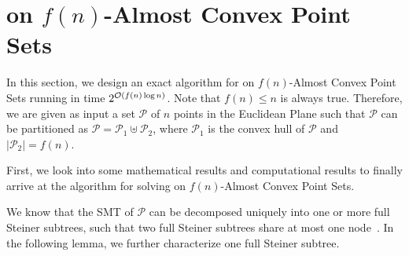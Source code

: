 


\section{\ESMT on $f(n)$-Almost Convex Point Sets}\label{sec:exact_algo}



In this section, we design an exact algorithm for \ESMT on $f(n)$-Almost Convex Point Sets running in time $2^{\mathcal{O}(f(n)\log n)}$. Note that $f(n) \leq n$ is always true. Therefore, we are given as input a set $\mathcal{P}$ of $n$ points in the Euclidean Plane such that $\mathcal P$ can be partitioned as $\mathcal P = \mathcal P_1 \uplus \mathcal P_2$, where $\mathcal P_1$ is the convex hull of $\mathcal P$ and $|\mathcal P_2| = f(n)$.

First, we look into some mathematical results and computational results to finally arrive at the algorithm for solving \ESMT on $f(n)$-Almost Convex Point Sets. 

We know that the SMT of $\mathcal P$ can be decomposed uniquely into one or more full Steiner subtrees, such that two full Steiner subtrees share at most one node~\cite{hwang1992steiner}. In the following lemma, we further characterize one full Steiner subtree.

